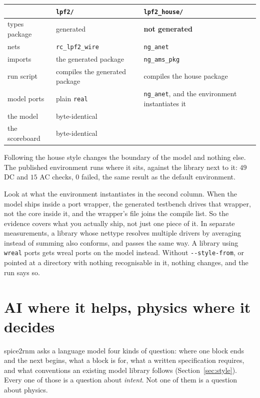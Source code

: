 \documentclass[11pt,a4paper]{article}
\begin{document}
\begin{center}
\begin{tabular}{@{}lll@{}}
\toprule
 & \textbf{\texttt{lpf2/}} & \textbf{\texttt{lpf2{}\_house/}} \\
\midrule
types package & generated            & \textbf{not generated} \\
nets          & \texttt{rc{}\_lpf2{}\_wire} & \texttt{ng{}\_anet} \\
imports       & the generated package & \texttt{ng{}\_ams{}\_pkg} \\
run script    & compiles the generated package & compiles the house package \\
model ports   & plain \texttt{real}     & \texttt{ng{}\_anet}, and the
                                     environment instantiates it \\
\midrule
the model     & \multicolumn{2}{l}{byte-identical} \\
the scoreboard & \multicolumn{2}{l}{byte-identical} \\
\bottomrule
\end{tabular}
\end{center}

\noindent Following the house style changes the boundary of the model
and nothing else. The published environment runs where it sits,
against the library next to it: $49$ DC and $15$ AC checks, $0$
failed, the same result as the default environment.

Look at what the environment instantiates in the second column. When
the model ships inside a port wrapper, the generated testbench drives
that wrapper, not the core inside it, and the wrapper's file joins the
compile list. So the evidence covers what you actually ship, not just
one piece of it. In separate measurements, a library whose nettype
resolves multiple drivers by averaging instead of summing also
conforms, and passes the same way. A library using \texttt{wreal}
ports gets wreal ports on the model instead. Without
\texttt{-{}-style-from}, or pointed at a directory with nothing
recognisable in it, nothing changes, and the run says so.

\section{AI where it helps, physics where it decides}

spice2rnm asks a language model four kinds of question: where one
block ends and the next begins, what a block is for, what a written
specification requires, and what conventions an existing model library
follows (Section~\ref{sec:style}). Every one of those is a question
about \emph{intent}. Not one of them is a question about physics.
\end{document}
